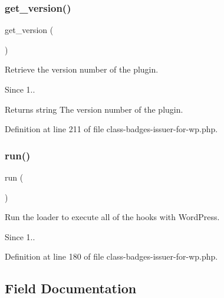 \subsubsection{\texorpdfstring{get\+\_\+version()}{get\_version()}}
{\footnotesize\ttfamily get\+\_\+version (\begin{DoxyParamCaption}{ }\end{DoxyParamCaption})}

Retrieve the version number of the plugin.

\begin{DoxySince}{Since}
1.. 
\end{DoxySince}
\begin{DoxyReturn}{Returns}
string The version number of the plugin. 
\end{DoxyReturn}


Definition at line 211 of file class-\/badges-\/issuer-\/for-\/wp.\+php.

\mbox{\label{class_badges___issuer___for___wp_afb0fafe7e02a3ae1993c01c19fad2bae}} 
\subsubsection{\texorpdfstring{run()}{run()}}
{\footnotesize\ttfamily run (\begin{DoxyParamCaption}{ }\end{DoxyParamCaption})}

Run the loader to execute all of the hooks with Word\+Press.

\begin{DoxySince}{Since}
1.. 
\end{DoxySince}


Definition at line 180 of file class-\/badges-\/issuer-\/for-\/wp.\+php.



\subsection{Field Documentation}
\mbox{\label{class_badges___issuer___for___wp_ab832f4c463ee1c9ba2e9464265f7ea3b}} 

